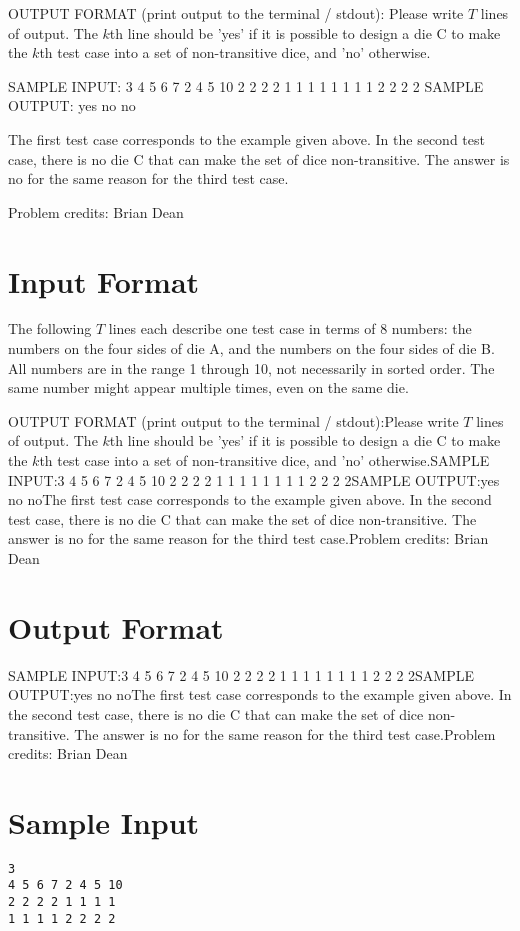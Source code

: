 \documentclass[12pt]{article}
\begin{document}
OUTPUT FORMAT (print output to the terminal / stdout):
Please write $T$ lines of output.  The $k$th line should be 'yes' if it is
possible to design a die C to make the $k$th test case into a set of
non-transitive dice, and 'no' otherwise.

SAMPLE INPUT:
3
4 5 6 7 2 4 5 10
2 2 2 2 1 1 1 1
1 1 1 1 2 2 2 2
SAMPLE OUTPUT: 
yes
no
no

The first test case corresponds to the example given above.  In the second test
case, there is no die C that can make the set of dice non-transitive.  The
answer is no for the same reason for the third test case.


Problem credits: Brian Dean



\section*{Input Format}
The following $T$ lines each describe one test case in terms of 8 numbers: the
numbers on the four sides of die A, and the numbers on the four sides of die B. 
All numbers are in the range 1 through 10, not necessarily in sorted order. The
same number might appear multiple times, even on the same die.

OUTPUT FORMAT (print output to the terminal / stdout):Please write $T$ lines of output.  The $k$th line should be 'yes' if it is
possible to design a die C to make the $k$th test case into a set of
non-transitive dice, and 'no' otherwise.SAMPLE INPUT:3
4 5 6 7 2 4 5 10
2 2 2 2 1 1 1 1
1 1 1 1 2 2 2 2SAMPLE OUTPUT:yes
no
noThe first test case corresponds to the example given above.  In the second test
case, there is no die C that can make the set of dice non-transitive.  The
answer is no for the same reason for the third test case.Problem credits: Brian Dean

\section*{Output Format}
SAMPLE INPUT:3
4 5 6 7 2 4 5 10
2 2 2 2 1 1 1 1
1 1 1 1 2 2 2 2SAMPLE OUTPUT:yes
no
noThe first test case corresponds to the example given above.  In the second test
case, there is no die C that can make the set of dice non-transitive.  The
answer is no for the same reason for the third test case.Problem credits: Brian Dean

\section*{Sample Input}
\begin{verbatim}
3
4 5 6 7 2 4 5 10
2 2 2 2 1 1 1 1
1 1 1 1 2 2 2 2
\end{verbatim}
\end{document}
